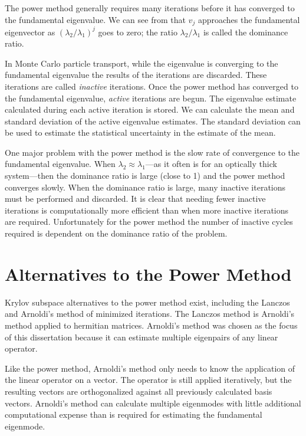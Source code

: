 The power method generally requires many iterations before it has converged to the fundamental eigenvalue.  We can see from  that $v_j$ approaches the fundamental eigenvector as $\left(\lambda_2/\lambda_1\right)^j$ goes to zero; the ratio $\lambda_2/\lambda_1$ is called the dominance ratio.

In Monte Carlo particle transport, while the eigenvalue is converging to the fundamental eigenvalue the results of the iterations are discarded.  These iterations are called \emph{inactive} iterations.  Once the power method has converged to the fundamental eigenvalue, \emph{active} iterations are begun.  The eigenvalue estimate calculated during each active iteration is stored.  We can calculate the mean and standard deviation of the active eigenvalue estimates.  The standard deviation can be used to estimate the statistical uncertainty in the estimate of the mean.  

One major problem with the power method is the slow rate of convergence to the fundamental eigenvalue.  When \mbox{$\lambda_2 \approx \lambda_1$}---as it often is for an optically thick system---then the dominance ratio is large (close to 1) and the power method converges slowly.  When the dominance ratio is large, many inactive iterations must be performed and discarded.  It is clear that needing fewer inactive iterations is computationally more efficient than when more inactive iterations are required.  Unfortunately for the power method the number of inactive cycles required is dependent on the dominance ratio of the problem.

\section{Alternatives to the Power Method \label{sec:PowerMethodAlternatives}}
Krylov subspace alternatives to the power method exist, including the Lanczos and Arnoldi's method of minimized iterations\cite{Arnoldi:1951The-P-0}.  The Lanczos method is Arnoldi's method applied to hermitian matrices.  Arnoldi's method was chosen as the focus of this dissertation because it can estimate multiple eigenpairs of any linear operator.

Like the power method, Arnoldi's method only needs to know the application of the linear operator on a vector.  The operator is still applied iteratively, but the resulting vectors are orthogonalized against all previously calculated basis vectors.  Arnoldi's method can calculate multiple eigenmodes with little additional computational expense than is required for estimating the fundamental eigenmode.

